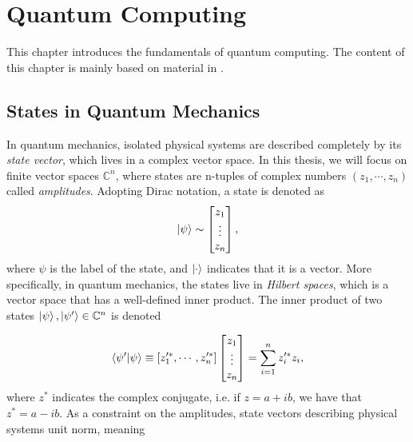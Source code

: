 \chapter{Quantum Computing}\label{chap:QuantumComputing}
This chapter introduces the fundamentals of quantum computing. The content of this chapter is mainly based on material in \citet{NielsenQuantum}.


\section{States in Quantum Mechanics}\label{sec:IntroQM}
In quantum mechanics, isolated physical systems are described completely by its \emph{state vector}, which lives in a complex vector space. In this thesis, we will focus on finite vector spaces $\mathbb{C}^n$, where states are n-tuples of complex numbers $(z_1, \cdots, z_n)$ called \emph{amplitudes}. Adopting Dirac notation, a state is denoted as 
\begin{equation}
    \ket{\psi} \sim \begin{bmatrix}
           z_{1} \\
           \vdots \\
           z_{n}
         \end{bmatrix},
\end{equation}
where $\psi$ is the label of the state, and $\ket{\cdot}$ indicates that it is a vector. More specifically, in quantum mechanics, the states live in \emph{Hilbert spaces}, which is a vector space that has a well-defined inner product. The inner product of two states $\ket{\psi}, \ket{\psi'} \in \mathbb{C}^n$ is denoted 

\begin{equation}
    \braket{\psi'}{\psi} \equiv [z_1'^*, \cdots, z_n'^*] 
    \begin{bmatrix}
        z_{1} \\
        \vdots \\
        z_{n}
    \end{bmatrix}
    = \sum_{i=1}^{n} z_i'^* z_i, 
\end{equation}
where $z^*$ indicates the complex conjugate, i.e. if $z = a + ib$, we have that $z^* = a - ib$. As a constraint on the amplitudes, state vectors describing physical systems unit norm, meaning 

